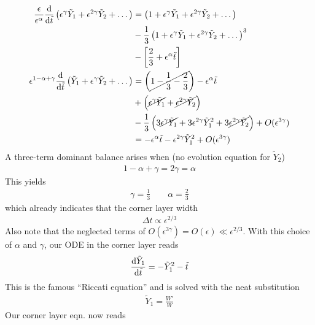 \begin{align*}
 \frac{\epsilon}{\epsilon^\alpha}\frac{\mathrm{d} }{\mathrm{d} \tilde{t}} \left(\epsilon^\gamma \tilde{Y}_1 + \epsilon^{2\gamma}\tilde{Y}_2 + \dots\right) &= \left(1 + \epsilon^\gamma \tilde{Y}_1 + \epsilon^{2\gamma} \tilde{Y}_2 + \dots \right)\\
 &- \frac{1}{3}\left(1 + \epsilon^\gamma \tilde{Y}_1 + \epsilon^{2\gamma} \tilde{Y}_2 + \dots \right)^3 \\
 &- \left[\frac{2}{3} + \epsilon^\alpha \tilde{t} \right] \\
 \epsilon^{1-\alpha + \gamma} \frac{\mathrm{d}}{\mathrm{d} \tilde{t}} \left(\tilde{Y}_1 + \epsilon^\gamma \tilde{Y}_2 + \dots\right) &= \left(\cancel{1 - \frac{1}{3} - \frac{2}{3}}\right) - \epsilon^\alpha \tilde{t} \\
 &+ \left(\cancel{\epsilon^\gamma \tilde{Y}_1} + \cancel{\epsilon^{2\gamma} \tilde{Y}_2}\right) \\
 &-\frac{1}{3} \left( 3 \cancel{\epsilon^\gamma \tilde{Y}_1} + 3 \epsilon^{2\gamma}\tilde{Y}^2_1 + 3 \cancel{\epsilon^{2\gamma} \tilde{Y}_2} \right) + O(\epsilon^{3\gamma})\\
 &= -\epsilon^\alpha \tilde{t} - \epsilon^{2\gamma}\tilde{Y}_1^2 + O(\epsilon^{3\gamma})
\end{align*}
A three-term dominant balance arises when (no evolution equation for $\tilde{Y}_2$)
\begin{gather*}
	1 - \alpha + \gamma = 2\gamma = \alpha 
\end{gather*}
This yields
\begin{gather}
	\gamma = \frac{1}{3} \qquad \alpha = \frac{2}{3} \label{eqn:wk21-corner-scaling}
\end{gather}
which already indicates that the corner layer width
\begin{gather*}
	\Delta t \propto \epsilon^{2/3}
\end{gather*}
Also note that the neglected terms of $O(\epsilon^{3\gamma}) = O(\epsilon) \ll \epsilon^{2/3}$. With this choice of $\alpha$ and $\gamma$, our ODE in the corner layer reads
\begin{gather}
	\frac{\mathrm{d} \tilde{Y}_1}{\mathrm{d} \tilde{t}} = - \tilde{Y}^2_1 - \tilde{t} \label{eqn:wk21-corner-nonlin-ode}
\end{gather}
This is the famous ``Riccati equation'' and is solved with the neat substitution
\begin{gather}
	\tilde{Y}_1 = \frac{W'}{W} \label{eqn:wk21-riccati-sub}
\end{gather} 
Our corner layer eqn. now reads
